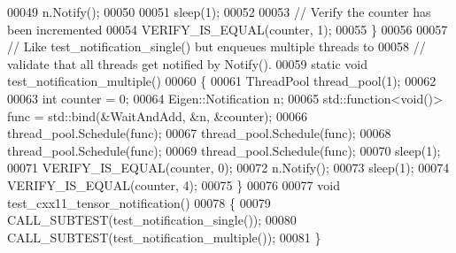 \begin{DoxyCode}
00049   n.Notify();
00050 
00051   sleep(1);
00052 
00053   \textcolor{comment}{// Verify the counter has been incremented}
00054   VERIFY\_IS\_EQUAL(counter, 1);
00055 \}
00056 
00057 \textcolor{comment}{// Like test\_notification\_single() but enqueues multiple threads to}
00058 \textcolor{comment}{// validate that all threads get notified by Notify().}
00059 \textcolor{keyword}{static} \textcolor{keywordtype}{void} test\_notification\_multiple()
00060 \{
00061   ThreadPool thread\_pool(1);
00062 
00063   \textcolor{keywordtype}{int} counter = 0;
00064   Eigen::Notification n;
00065   std::function<void()> func = std::bind(&WaitAndAdd, &n, &counter);
00066   thread\_pool.Schedule(func);
00067   thread\_pool.Schedule(func);
00068   thread\_pool.Schedule(func);
00069   thread\_pool.Schedule(func);
00070   sleep(1);
00071   VERIFY\_IS\_EQUAL(counter, 0);
00072   n.Notify();
00073   sleep(1);
00074   VERIFY\_IS\_EQUAL(counter, 4);
00075 \}
00076 
00077 \textcolor{keywordtype}{void} test\_cxx11\_tensor\_notification()
00078 \{
00079   CALL\_SUBTEST(test\_notification\_single());
00080   CALL\_SUBTEST(test\_notification\_multiple());
00081 \}
\end{DoxyCode}
